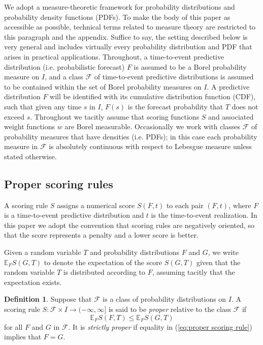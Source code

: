 \documentclass[10pt]{article} %
\theoremstyle{theorem}
\theoremstyle{definition}
\newtheorem{defn}{Definition}
\newcommand{\EEE}{\mathbb{E}}
\begin{document}
We adopt a measure-theoretic framework for probability distributions and probability density functions (PDFs). To make the body of this paper as accessible as possible, technical terms related to measure theory are restricted to this paragraph and the appendix. Suffice to say, the setting described below is very general and includes virtually every probability distribution and PDF that arises in practical applications. Throughout, a time-to-event predictive distribution (i.e. probabilistic forecast) $F$ is assumed to be a Borel probability measure on $I$, and a class $\mathcal{F}$ of time-to-event predictive distributions is assumed to be contained within the set of Borel probability measures on $I$. A predictive distribution $F$ will be identified with its cumulative distribution function (CDF), such that given any time $s$ in $I$, $F(s)$ is the forecast probability that $T$ does not exceed $s$. Throughout we tacitly assume that scoring functions $S$ and associated weight functions $w$ are Borel measurable. Occasionally we work with classes $\mathcal{F}$ of probability measures that have densities (i.e. PDFs); in this case each probability measure in $\mathcal{F}$ is absolutely continuous with respect to Lebesgue measure unless stated otherwise.

\subsection{Proper scoring rules}

A scoring rule $S$ assigns a numerical score $S(F, t)$ to each pair $(F, t)$, where $F$ is a time-to-event predictive distribution and $t$ is the time-to-event realization. In this paper we adopt the convention that scoring rules are negatively oriented, so that the score represents a penalty and a lower score is better.

Given a random variable $T$ and probability distributions $F$ and $G$, we write $\EEE_F S(G,T)$ to denote the expectation of the score $S(G,T)$ given that the random variable $T$ is distributed according to $F$, assuming tacitly that the expectation exists.

\begin{defn}
Suppose that $\mathcal{F}$ is a class of probability distributions on $I$.
A scoring rule $S:\mathcal{F}\times I \to(-\infty,\infty]$ is said to be \textit{proper} relative to the class $\mathcal{F}$ if
\begin{equation}\label{eq:proper scoring rule}
\EEE_F S(F,T) \leq \EEE_F S(G,T)
\end{equation}
for all $F$ and $G$ in $\mathcal{F}$. It is  \textit{strictly proper} if equality in (\ref{eq:proper scoring rule}) implies that $F=G$.
\end{defn}
\end{document}
